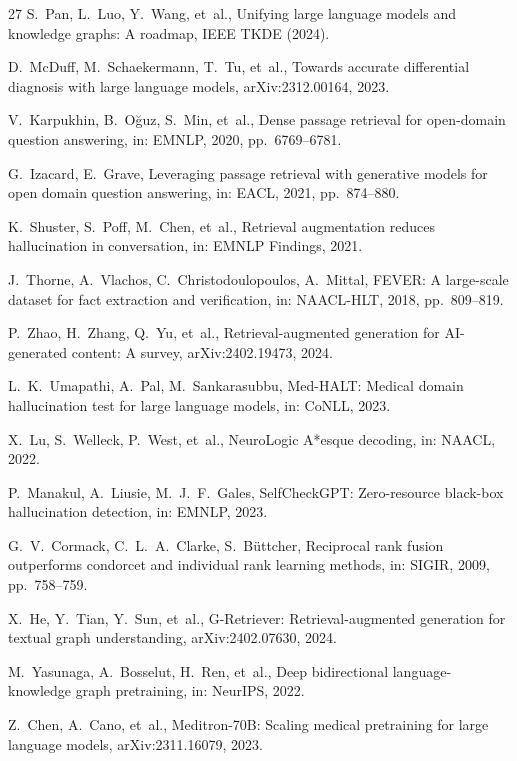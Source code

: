 \documentclass[preprint,12pt]{elsarticle}
\begin{document}
\begin{thebibliography}{27}
S.~Pan, L.~Luo, Y.~Wang, et~al., Unifying large language models and knowledge graphs: A roadmap, IEEE TKDE (2024).

D.~McDuff, M.~Schaekermann, T.~Tu, et~al., Towards accurate differential diagnosis with large language models, arXiv:2312.00164, 2023.

V.~Karpukhin, B.~O\u{g}uz, S.~Min, et~al., Dense passage retrieval for open-domain question answering, in: EMNLP, 2020, pp.~6769--6781.

G.~Izacard, E.~Grave, Leveraging passage retrieval with generative models for open domain question answering, in: EACL, 2021, pp.~874--880.

K.~Shuster, S.~Poff, M.~Chen, et~al., Retrieval augmentation reduces hallucination in conversation, in: EMNLP Findings, 2021.

J.~Thorne, A.~Vlachos, C.~Christodoulopoulos, A.~Mittal, FEVER: A large-scale dataset for fact extraction and verification, in: NAACL-HLT, 2018, pp.~809--819.

P.~Zhao, H.~Zhang, Q.~Yu, et~al., Retrieval-augmented generation for AI-generated content: A survey, arXiv:2402.19473, 2024.

L.~K.~Umapathi, A.~Pal, M.~Sankarasubbu, Med-HALT: Medical domain hallucination test for large language models, in: CoNLL, 2023.

X.~Lu, S.~Welleck, P.~West, et~al., NeuroLogic A*esque decoding, in: NAACL, 2022.

P.~Manakul, A.~Liusie, M.~J.~F.~Gales, SelfCheckGPT: Zero-resource black-box hallucination detection, in: EMNLP, 2023.

G.~V.~Cormack, C.~L.~A.~Clarke, S.~B\"uttcher, Reciprocal rank fusion outperforms condorcet and individual rank learning methods, in: SIGIR, 2009, pp.~758--759.

X.~He, Y.~Tian, Y.~Sun, et~al., G-Retriever: Retrieval-augmented generation for textual graph understanding, arXiv:2402.07630, 2024.

M.~Yasunaga, A.~Bosselut, H.~Ren, et~al., Deep bidirectional language-knowledge graph pretraining, in: NeurIPS, 2022.

Z.~Chen, A.~Cano, et~al., Meditron-70B: Scaling medical pretraining for large language models, arXiv:2311.16079, 2023.

\end{thebibliography}
\end{document}
